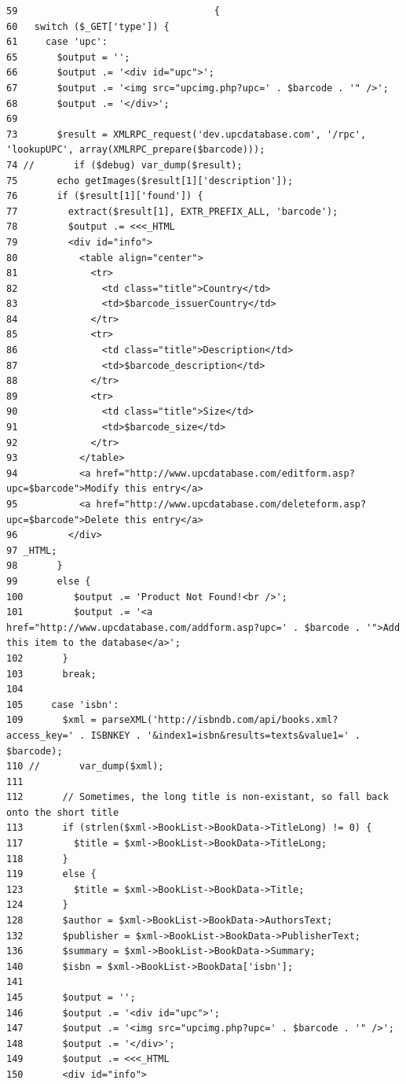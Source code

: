 \begin{Code}\begin{verbatim}59                                   {
60   switch ($_GET['type']) {
61     case 'upc':
65       $output = '';
66       $output .= '<div id="upc">';
67       $output .= '<img src="upcimg.php?upc=' . $barcode . '" />';
68       $output .= '</div>';
69 
73       $result = XMLRPC_request('dev.upcdatabase.com', '/rpc', 'lookupUPC', array(XMLRPC_prepare($barcode)));
74 //       if ($debug) var_dump($result);
75       echo getImages($result[1]['description']);
76       if ($result[1]['found']) {
77         extract($result[1], EXTR_PREFIX_ALL, 'barcode');
78         $output .= <<<_HTML
79         <div id="info">
80           <table align="center">
81             <tr>
82               <td class="title">Country</td>
83               <td>$barcode_issuerCountry</td>
84             </tr>
85             <tr>
86               <td class="title">Description</td>
87               <td>$barcode_description</td>
88             </tr>
89             <tr>
90               <td class="title">Size</td>
91               <td>$barcode_size</td>
92             </tr>
93           </table>
94           <a href="http://www.upcdatabase.com/editform.asp?upc=$barcode">Modify this entry</a>
95           <a href="http://www.upcdatabase.com/deleteform.asp?upc=$barcode">Delete this entry</a>
96         </div>
97 _HTML;
98       }
99       else {
100         $output .= 'Product Not Found!<br />';
101         $output .= '<a href="http://www.upcdatabase.com/addform.asp?upc=' . $barcode . '">Add this item to the database</a>';
102       }
103       break;
104 
105     case 'isbn':
109       $xml = parseXML('http://isbndb.com/api/books.xml?access_key=' . ISBNKEY . '&index1=isbn&results=texts&value1=' . $barcode);
110 //       var_dump($xml);
111 
112       // Sometimes, the long title is non-existant, so fall back onto the short title
113       if (strlen($xml->BookList->BookData->TitleLong) != 0) {
117         $title = $xml->BookList->BookData->TitleLong;
118       }
119       else {
123         $title = $xml->BookList->BookData->Title;
124       }
128       $author = $xml->BookList->BookData->AuthorsText;
132       $publisher = $xml->BookList->BookData->PublisherText;
136       $summary = $xml->BookList->BookData->Summary;
140       $isbn = $xml->BookList->BookData['isbn'];
141 
145       $output = '';
146       $output .= '<div id="upc">';
147       $output .= '<img src="upcimg.php?upc=' . $barcode . '" />';
148       $output .= '</div>';
149       $output .= <<<_HTML
150       <div id="info">

\end{verbatim}
\end{Code}
